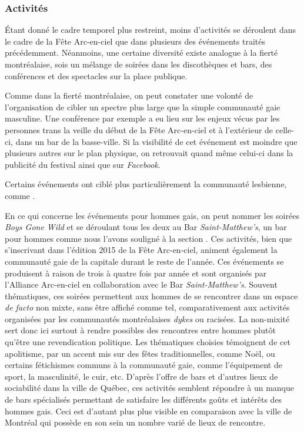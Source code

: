 \subsubsection{Activités}
\label{subsec:activitesfetearcenciel}
Étant donné le cadre temporel plus restreint, moins d'activités se déroulent dans le cadre de la Fête Arc-en-ciel que dans plusieurs des événements traités précédemment.
Néanmoins, une certaine diversité existe analogue à la fierté montréalaise, sois un mélange de soirées dans les discothèques et bars, des conférences et des spectacles sur la place publique.

Comme dans la fierté montréalaise, on peut constater une volonté de l'organisation de cibler un spectre plus large que la simple communauté gaie masculine.
Une conférence par exemple a eu lieu sur les enjeux vécus par les personnes trans la veille du début de la Fête Arc-en-ciel et à l'extérieur de celle-ci, dans un bar de la basse-ville.
Si la visibilité de cet événement est moindre que plusieurs autres sur le plan physique, on retrouvait quand même celui-ci dans la publicité du festival ainsi que sur \emph{Facebook}.

Certains événements ont ciblé plus particulièrement la communauté lesbienne, comme .

En ce qui concerne les événements pour hommes gais, on peut nommer les soirées \emph{Boys Gone Wild} et  se déroulant tous les deux au Bar \emph{Saint-Matthew's}, un bar pour hommes comme nous l'avons souligné à la section .
Ces activités, bien que s'inscrivant dans l'édition 2015 de la Fête Arc-en-ciel, animent également la communauté gaie de la capitale durant le reste de l'année.
Ces événements se produisent à raison de trois à quatre fois par année et sont organisés par l'Alliance Arc-en-ciel en collaboration avec le Bar \emph{Saint-Matthew's}.
Souvent thématiques, ces soirées permettent aux hommes de se rencontrer dans un espace \emph{de facto} non mixte, sans être affiché comme tel, comparativement aux activités organisées par les communautés montréalaises \emph{dykes} ou racisées.
La non-mixité sert donc ici surtout à rendre possibles des rencontres entre hommes plutôt qu'être une revendication politique.
Les thématiques choisies témoignent de cet apolitisme, par un accent mis sur des fêtes traditionnelles, comme Noël, ou certains fétichismes communs à la communauté gaie, comme l'équipement de sport, la masculinité, le cuir, etc.
D'après l'offre de bars et d'autres lieux de sociabilité dans la ville de Québec, ces activités semblent répondre à un manque de bars spécialisés permettant de satisfaire les différents goûts et intérêts des hommes gais.
Ceci est d'autant plus plus visible en comparaison avec la ville de Montréal qui possède en son sein un nombre varié de lieux de rencontre.

